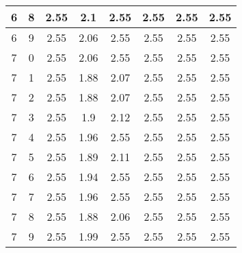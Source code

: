 \begin{longtable}{|c|c||c||c|c||c|c|c|}
	6 & 8 & 2.55 & 2.1 & 2.55 & 2.55 & 2.55 & 2.55 \\ \hline
	6 & 9 & 2.55 & 2.06 & 2.55 & 2.55 & 2.55 & 2.55 \\ \hline
	7 & 0 & 2.55 & 2.06 & 2.55 & 2.55 & 2.55 & 2.55 \\ \hline
	7 & 1 & 2.55 & 1.88 & 2.07 & 2.55 & 2.55 & 2.55 \\ \hline
	7 & 2 & 2.55 & 1.88 & 2.07 & 2.55 & 2.55 & 2.55 \\ \hline
	7 & 3 & 2.55 & 1.9 & 2.12 & 2.55 & 2.55 & 2.55 \\ \hline
	7 & 4 & 2.55 & 1.96 & 2.55 & 2.55 & 2.55 & 2.55 \\ \hline
	7 & 5 & 2.55 & 1.89 & 2.11 & 2.55 & 2.55 & 2.55 \\ \hline
	7 & 6 & 2.55 & 1.94 & 2.55 & 2.55 & 2.55 & 2.55 \\ \hline
	7 & 7 & 2.55 & 1.96 & 2.55 & 2.55 & 2.55 & 2.55 \\ \hline
	7 & 8 & 2.55 & 1.88 & 2.06 & 2.55 & 2.55 & 2.55 \\ \hline
	7 & 9 & 2.55 & 1.99 & 2.55 & 2.55 & 2.55 & 2.55 \\ \hline
\end{longtable}
\clearpage{}
